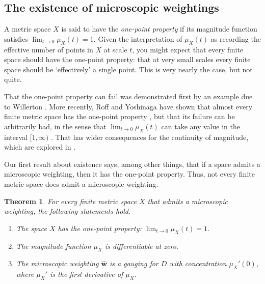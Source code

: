 \documentclass[a4paper, oneside, reqno]{amsart}
\newtheorem{theorem}{Theorem}[section]
\theoremstyle{definition}
\theoremstyle{remark}
\numberwithin{equation}{section}
\newcommand{\demph}[1]{\emph{#1}}
\renewcommand{\vec}{\mathbf}
\newcommand{\micro}{\widehat{\vec{w}}}
\begin{document}

\subsection{The existence of microscopic weightings}

A metric space \(X\) is said to have the \demph{one-point property} if its magnitude function satisfies \(\lim_{t \to 0} \mu_X(t) = 1\). Given the interpretation of \(\mu_X(t)\) as recording the effective number of points in \(X\) at scale \(t\), you might expect that every finite space should have the one-point property: that at very small scales every finite space should be `effectively' a single point. This is very nearly the case, but not quite. 

That the one-point property can fail was demonstrated first by an example due to Willerton \cite[Example~2.2.8]{LeinsterMagnitude2013}. More recently, Roff and Yoshinaga have shown that almost every finite metric space has the one-point property \cite[Theorem~2.3]{RoffYoshinaga}, but that its failure can be arbitrarily bad, in the sense that \(\lim_{t \to 0} \mu_X(t)\) can take any value in the interval \([1, \infty)\) \cite[Theorem~3.8]{RoffYoshinaga}. That has wider consequences for the continuity of magnitude, which are explored in \cite{KatsumasaRoffYoshinaga}.

Our first result about existence says, among other things, that if a space admits a microscopic weighting, then it has the one-point property. Thus, not every finite metric space does admit a microscopic weighting. 

\begin{theorem}
\label{thm:microwtg_consequences}
For every finite metric space \(X\) that admits a microscopic weighting, the following statements hold.
    \begin{enumerate}
        \item
        \label{thm:microwtg_consequences_1}
        The space \(X\) has the one-point property: \(\lim_{t \to 0} \mu_X(t) = 1\).
        
        \item
        \label{thm:microwtg_consequences_2}
        The magnitude function \(\mu_X\) is differentiable at zero.

        \item
        \label{thm:microwtg_consequences_3}
        The microscopic weighting \(\micro\) is a gauging for \(D\) with concentration \(\mu_X'(0)\), where \(\mu_X'\) is the first derivative of \(\mu_X\).
    \end{enumerate}
\end{theorem}
\end{document}
